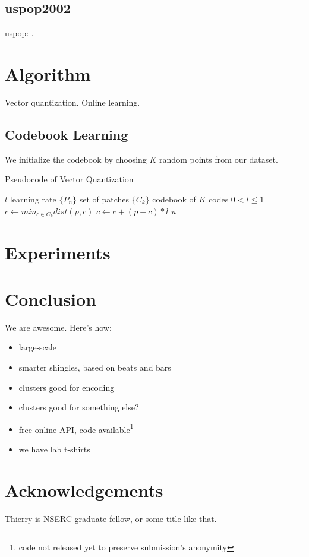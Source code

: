 \documentclass{article}
\begin{document}
\subsection{uspop2002}
uspop: \cite{uspop2002}.


\section{Algorithm}\label{sec:algo}

Vector quantization. Online learning.

\subsection{Codebook Learning}
We initialize the codebook by choosing $K$ random points from our dataset.


\begin{algorithm}
\caption{Pseudocode of Vector Quantization}
\label{alg:vq}
\begin{algorithmic}
\STATE$l$ learning rate
\STATE$\{P_n\}$ set of patches
\STATE$\{C_k\}$ codebook of $K$ codes
\REQUIRE $0 < l \leq 1$
\STATE$c \leftarrow min_{c \in C_k} dist(p,c)$
\STATE$c \leftarrow c + (p - c) * l$
\ENDFOR
\ENDFOR
\RETURN $u$
\end{algorithmic}
\end{algorithm}




\section{Experiments}\label{sec:experiments}





\section{Conclusion}
We are awesome. Here's how:
\begin{itemize}
\item large-scale
\item smarter shingles, based on beats and bars
\item clusters good for encoding
\item clusters good for something else?
\item free online API, code available\footnote{code not released yet to preserve submission's anonymity}
\item we have lab t-shirts
\end{itemize}



\small
\section{Acknowledgements}
Thierry is NSERC graduate fellow, or some title like that.




\end{document}
